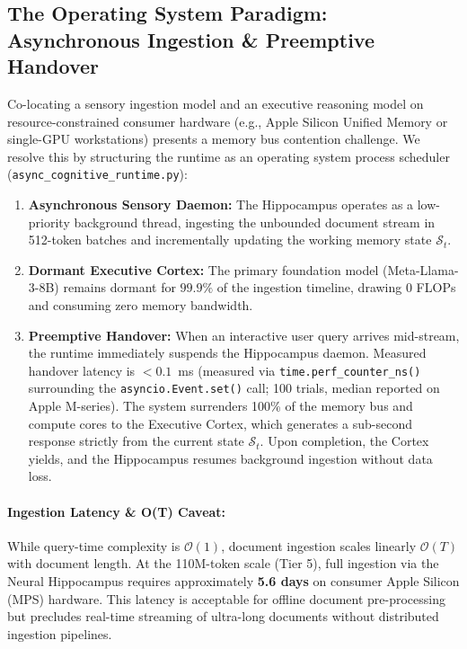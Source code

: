 \documentclass[11pt,a4paper]{article}
\begin{document}
\subsection{The Operating System Paradigm: Asynchronous Ingestion \& Preemptive Handover}
Co-locating a sensory ingestion model and an executive reasoning model on resource-constrained consumer hardware (e.g., Apple Silicon Unified Memory or single-GPU workstations) presents a memory bus contention challenge. We resolve this by structuring the runtime as an operating system process scheduler (\texttt{async\_cognitive\_runtime.py}):
\begin{enumerate}[leftmargin=*]
    \item \textbf{Asynchronous Sensory Daemon:} The Hippocampus operates as a low-priority background thread, ingesting the unbounded document stream in 512-token batches and incrementally updating the working memory state $\mathcal{S}_t$.
    \item \textbf{Dormant Executive Cortex:} The primary foundation model (Meta-Llama-3-8B) remains dormant for $99.9\%$ of the ingestion timeline, drawing 0 FLOPs and consuming zero memory bandwidth.
    \item \textbf{Preemptive Handover:} When an interactive user query arrives mid-stream, the runtime immediately suspends the Hippocampus daemon. Measured handover latency is $<0.1$~ms (measured via \texttt{time.perf\_counter\_ns()} surrounding the \texttt{asyncio.Event.set()} call; 100 trials, median reported on Apple M-series). The system surrenders 100\% of the memory bus and compute cores to the Executive Cortex, which generates a sub-second response strictly from the current state $\mathcal{S}_t$. Upon completion, the Cortex yields, and the Hippocampus resumes background ingestion without data loss.
\end{enumerate}

\paragraph{Ingestion Latency \& O(T) Caveat:} While query-time complexity is $\mathcal{O}(1)$, document ingestion scales linearly $\mathcal{O}(T)$ with document length. At the 110M-token scale (Tier 5), full ingestion via the Neural Hippocampus requires approximately \textbf{5.6 days} on consumer Apple Silicon (MPS) hardware. This latency is acceptable for offline document pre-processing but precludes real-time streaming of ultra-long documents without distributed ingestion pipelines.
\end{document}
